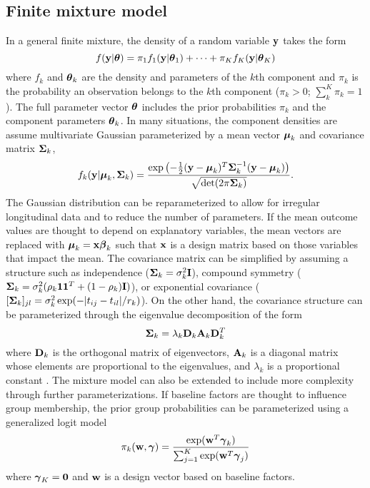 \subsection{Finite mixture model}
In a general finite mixture, the density of a random variable $\mathbf y$ takes the form
$$f(\mathbf y|\boldsymbol\theta)=\pi_{1}f_{1}(\mathbf y|\boldsymbol\theta_1)+\cdots+\pi_{K}f_{K}(\mathbf y|\boldsymbol\theta_K)$$
where $f_k$ and $\boldsymbol\theta_k$ are the density and parameters of the $k$th component and $\pi_{k}$ is the probability an observation belongs to the $k$th component ($\pi_{k}>0$; $\sum^{K}_{k}\pi_{k}=1$). The full parameter vector $\boldsymbol\theta$ includes the prior probabilities $\pi_k$ and the component parameters $\boldsymbol\theta_k$. In many situations, the component densities are assume multivariate Gaussian parameterized by a mean vector $\boldsymbol\mu_{k}$ and covariance matrix $\boldsymbol\Sigma_{k}$,
$$f_k(\mathbf y| \boldsymbol\mu_k,\boldsymbol\Sigma_k) = \frac{\exp\left(-\frac{1}{2}(\mathbf y - \boldsymbol\mu_k)^T\boldsymbol\Sigma_k^{-1}(\mathbf y-\boldsymbol\mu_k)\right)}{\sqrt{\det(2\pi \boldsymbol\Sigma_k)}}.$$
The Gaussian distribution can be reparameterized to allow for irregular longitudinal data and to reduce the number of parameters. If the mean outcome values are thought to depend on explanatory variables, the mean vectors are replaced with $\boldsymbol\mu_k = \mathbf x \boldsymbol \beta_k$ such that $\mathbf x$ is a design matrix based on those variables that impact the mean. The covariance matrix can be simplified by assuming a structure such as independence ($\boldsymbol\Sigma_{k}=\sigma^{2}_{k}\mathbf I$), compound symmetry ($\boldsymbol\Sigma_{k}=\sigma^{2}_{k}(\rho_{k}\mathbf1\mathbf1^{T}+(1-\rho_{k})\mathbf I)$), or exponential covariance  ($[\mathbf \Sigma_{k}]_{jl} = \sigma_{k}^{2}\exp(-| t_{ij}-t_{il}| / r_{k})$). On the other hand, the covariance structure can be parameterized through the eigenvalue decomposition of the form
$$\boldsymbol\Sigma_k=\lambda_k \mathbf D_k\mathbf A_k\mathbf D_k^T$$
where $\mathbf D_k$ is the orthogonal matrix of eigenvectors, $\mathbf A_k$ is a diagonal matrix whose elements are proportional to the eigenvalues, and $\lambda_k$ is a proportional constant \cite{banfield1993}. The mixture model can also be extended to include more complexity through further parameterizations. If baseline factors are thought to influence group membership, the prior group probabilities can be parameterized using a generalized logit model
$$\pi_k(\mathbf w,\boldsymbol\gamma)= \frac{\exp(\mathbf w^T \boldsymbol \gamma_k) }{\sum_{j=1}^K \exp(\mathbf w^T \boldsymbol \gamma_j)}$$
where $\boldsymbol\gamma_{K}=\mathbf 0$ and $\mathbf w$ is a design vector based on baseline factors. 

